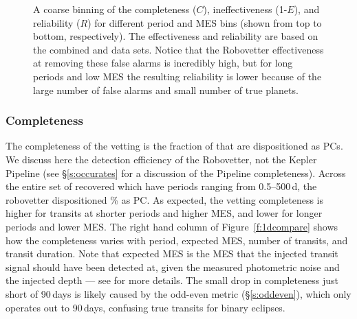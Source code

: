 \begin{figure}[htb]
\begin{center}
\caption{A coarse binning of the completeness ($C$), ineffectiveness (1-$E$), and reliability ($R$) for different period and MES bins (shown from top to bottom, respectively). The effectiveness and reliability are based on the combined \invtce{} and \scrtce{} data sets. Notice that the Robovetter effectiveness at removing these false alarms is incredibly high, but for long periods and low MES the resulting reliability is lower because of the large number of false alarms and small number of true planets.}
\label{f:scoregrid}
\end{center}
\end{figure}



\subsubsection{Completeness}
The completeness of the vetting is the fraction of  that are dispositioned as PCs. We discuss here the detection efficiency of the Robovetter, not the Kepler Pipeline (see \S\ref{s:occurates} for a discussion of the Pipeline completeness). Across the entire set of recovered  which have periods ranging from 0.5--500\,d, the robovetter dispositioned \completeness{}\% as PC. As expected, the vetting completeness is higher for transits at shorter periods and higher MES, and lower for longer periods and lower MES. The right hand column of Figure~\ref{f:1dcompare} shows how the completeness varies with period, expected MES, number of transits, and transit duration. Note that expected MES is the MES that the injected transit signal should have been detected at, given the measured photometric noise and the injected depth --- see \citealt{Christiansen2017} for more details. The small drop in completeness just short of 90\,days is likely caused by the odd-even metric (\S\ref{s:oddeven}), which only operates out to 90\,days, confusing true transits for binary eclipses.  


